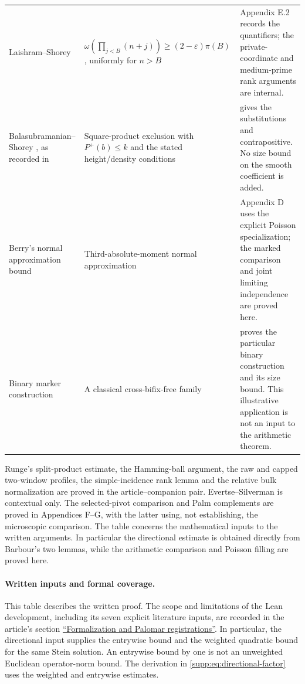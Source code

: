 \begin{longtable}{@{}L{.205\textwidth}L{.30\textwidth}L{.435\textwidth}@{}}
Laishram--Shorey \cite[eq.~(14), p.~331]{LaishramShorey2004}
& $\omega(\prod_{j<B}(n+j))\ge(2-\varepsilon)\pi(B)$, uniformly for $n>B$
& Appendix E.2 records the quantifiers; the private-coordinate and medium-prime rank arguments are internal.\\
Balasubramanian--Shorey \cite{BalasubramanianShorey1993}, as recorded in \cite[pp.~55--56]{Shorey1994BakerApplications}
& Square-product exclusion with $P^+(b)\le k$ and the stated height/density conditions
&  gives the substitutions and contrapositive. No size bound on the smooth coefficient is added.\\
Berry's normal approximation bound \cite{Berry1941}
& Third-absolute-moment normal approximation
& Appendix D uses the explicit Poisson specialization; the marked comparison and joint limiting independence are proved here.\\
Binary marker construction \cite{CheeKiahPurkayasthaWang2013}
& A classical cross-bifix-free family
&  proves the particular binary construction and its size bound. This illustrative application is not an input to the arithmetic theorem.\\
\end{longtable}
\endgroup

\medskip
Runge's split-product estimate, the Hamming-ball argument, the raw and
capped two-window profiles, the simple-incidence rank lemma and the
relative bulk normalization are proved in the article--companion pair.
Evertse--Silverman is contextual only. The selected-pivot comparison and
Palm complements are proved in Appendices F--G, with the latter using,
not establishing, the microscopic comparison. The table concerns the
mathematical inputs to the written arguments. In particular the directional estimate is obtained
directly from Barbour's two lemmas, while the arithmetic comparison and
Poisson filling are proved here.


\paragraph{Written inputs and formal coverage.}
This table describes the written proof. The scope and limitations of the
Lean development, including its seven explicit literature inputs, are recorded in
the article's section
\hyperref[sec:formalization]{``Formalization and Palomar registrations''}.
In particular, the directional input supplies the entrywise bound and the
weighted quadratic bound for the same Stein solution. An entrywise bound by one
is not an unweighted Euclidean operator-norm bound. The derivation in
\eqref{supp:eq:directional-factor} uses the weighted and entrywise estimates.
